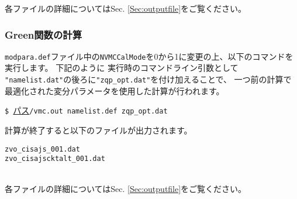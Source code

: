 各ファイルの詳細についてはSec. \ref{Sec:outputfile}をご覧ください。


\subsubsection{Green関数の計算}
\verb|modpara.def|ファイル中の\verb|NVMCCalMode|を0から1に変更の上、以下のコマンドを実行します。
下記のように
実行時のコマンドライン引数として
\verb|"namelist.dat"|の後ろに\verb|"zqp_opt.dat"|を付け加えることで、
一つ前の計算で最適化された変分パラメータを使用した計算が行われます。

\vspace{1cm}\hspace{-0.7cm}
\verb|$ |\underline{パス}\verb|/vmc.out namelist.def zqp_opt.dat|
\small

計算が終了すると以下のファイルが出力されます。
\\
\begin{minipage}{12cm}
\begin{screen}
\begin{verbatim}
zvo_cisajs_001.dat
zvo_cisajscktalt_001.dat
\end{verbatim}
\end{screen}
\end{minipage}
\\
各ファイルの詳細についてはSec. \ref{Sec:outputfile}をご覧ください。

